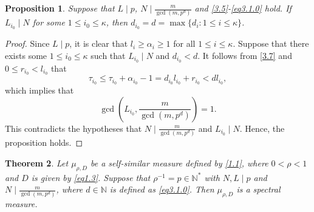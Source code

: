 \documentclass[11pt]{article}
\newtheorem{theorem}{Theorem}[section]
\newtheorem{proposition}[theorem]{Proposition}
\numberwithin{equation}{section}
\begin{document}
\begin{proposition}\label{pro3.4}
Suppose that $L\mid p$,  $N\mid \frac{m}{\gcd(m,p^d)}$ and \eqref{3.5}-\eqref{eq3.1.0} hold. If $L_{i_0}\mid N$ for some $1\leq i_0\leq \kappa$, then $d_{i_0}=d=\max\{d_i : 1 \leq i \leq \kappa\}$.
\end{proposition}

\begin{proof}
Since $L\mid p$, it is clear that $l_i\geq\alpha_{i}\geq 1$ for all $1 \leq i \leq \kappa$. Suppose that there exists some $1\leq i_0\leq \kappa$ such that $L_{i_0}\mid N$ and $d_{i_0}<d$.
It follows from \eqref{3.7} and $0\leq r_{i_0}<l_{i_0}$ that
$$
\tau_{i_0}\leq \tau_{i_0}+\alpha_{i_0}-1=d_{i_0}l_{i_0}+r_{i_0}<dl_{i_0},
$$
		which implies that
		$$
		\gcd\left(L_{{i_0}},\frac{m}{\gcd\left(m,p^{d}\right)}\right)=1.
		$$
		This contradicts the hypotheses that $N\mid \frac{m}{\gcd(m,p^d)}$ and $L_{i_0}\mid N$. Hence, the proposition holds.
\end{proof}






\begin{theorem}\label{thm3.3}
	Let $\mu_{\rho,D}$ be a self-similar measure defined by \eqref{1.1}, where $0<\rho<1$ and $D$ is given by \eqref{eq1.3}.  Suppose that $\rho^{-1}=p\in\mathbb{N}^*$ with $N,L\mid p$ and $N\mid \frac{m}{\gcd(m,p^d)}$, where $d \in \mathbb{N}$ is defined as \eqref{eq3.1.0}. Then $\mu_{\rho,D}$ is a spectral measure.
\end{theorem}
\end{document}
